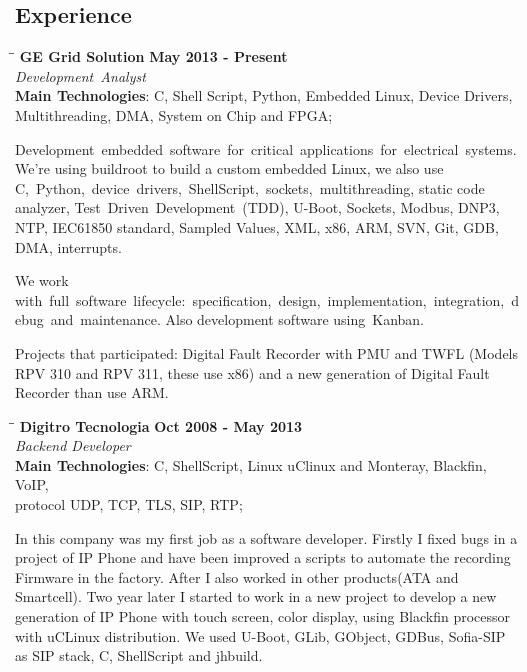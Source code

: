 \documentclass[margin]{res}
\begin{document}
\begin{resume}
\section{Experience}
\vspace{-0.1in}
    \begin{tabbing}
    \hspace{2.3in}\= \hspace{1.7in}\= \kill %
    \textbf{GE Grid Solution}    \>\>\textbf{May 2013 - Present}\\
    \textit{Development Analyst}\\
    \textbf{Main Technologies}: C, Shell Script, Python, Embedded Linux, Device Drivers,\\
                                Multithreading, DMA, System on Chip and FPGA;
    \end{tabbing}\vspace{-20pt}      %
    \vspace{2mm}
Development embedded software for critical applications for electrical systems. We're using buildroot to build a custom embedded Linux, we also use C, Python, device drivers, ShellScript, sockets, multithreading, static code analyzer, Test Driven Development (TDD), U-Boot, Sockets, Modbus, DNP3, NTP, IEC61850 standard, Sampled Values, XML, x86, ARM, SVN, Git, GDB, DMA, interrupts.

We work with full software lifecycle: specification, design, implementation, integration, debug and maintenance. Also development software using Kanban.

Projects that participated: Digital Fault Recorder with PMU and TWFL (Models RPV 310 and RPV 311, these use x86) and a new generation of Digital Fault Recorder than use ARM.

\vspace{-0.1in}
    \begin{tabbing}
    \hspace{2.3in}\= \hspace{1.7in}\= \kill
    \textbf{Digitro Tecnologia}    \>\>\textbf{Oct 2008 - May 2013}\\
    \textit{Backend Developer}\\
    \textbf{Main Technologies}: C, ShellScript, Linux uClinux and Monteray, Blackfin, VoIP,\\ protocol UDP, TCP, TLS, SIP, RTP;
    \end{tabbing}\vspace{-20pt}
    \vspace{2mm}
In this company was my first job as a software developer. Firstly I fixed bugs in a project of IP Phone and have been improved a scripts to automate the recording Firmware in the factory. After I also worked in other products(ATA and Smartcell). Two year later I started to work in a new project to develop a new generation of IP Phone with touch screen, color display, using Blackfin processor with uCLinux distribution. We used U-Boot, GLib, GObject, GDBus, Sofia-SIP as SIP stack, C, ShellScript and jhbuild.


\end{resume}
\end{document}
